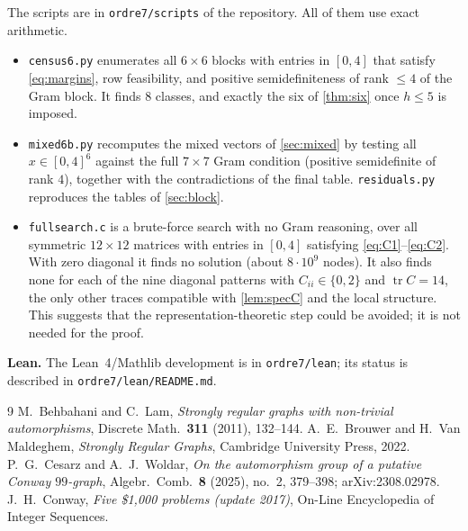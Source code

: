 \documentclass[11pt,a4paper]{amsart}
\theoremstyle{definition}
\theoremstyle{remark}
\newcommand{\tr}{\operatorname{tr}}
\begin{document}
The scripts are in \texttt{ordre7/scripts} of the repository. All of them use exact arithmetic.
\begin{itemize}[leftmargin=2em]
\item \texttt{census6.py} enumerates all $6\times6$ blocks with entries in $[0,4]$ that satisfy
\eqref{eq:margins}, row feasibility, and positive semidefiniteness of rank $\le4$ of the Gram block. It
finds $8$ classes, and exactly the six of \cref{thm:six} once $h\le5$ is imposed.
\item \texttt{mixed6b.py} recomputes the mixed vectors of \cref{sec:mixed} by testing all
$x\in[0,4]^6$ against the full $7\times7$ Gram condition (positive semidefinite of rank $4$), together
with the contradictions of the final table. \texttt{residuals.py} reproduces the tables of
\cref{sec:block}.
\item \texttt{fullsearch.c} is a brute-force search with no Gram reasoning, over all symmetric
$12\times12$ matrices with entries in $[0,4]$ satisfying \eqref{eq:C1}--\eqref{eq:C2}. With zero diagonal
it finds no solution (about $8\cdot10^9$ nodes). It also finds none for each of the nine diagonal patterns
with $C_{ii}\in\{0,2\}$ and $\tr C=14$, the only other traces compatible with \cref{lem:specC} and the local
structure. This suggests that the representation-theoretic step could be avoided; it is not needed for the
proof.
\end{itemize}

\noindent\textbf{Lean.} The Lean~4/Mathlib development is in \texttt{ordre7/lean}; its status is described
in \texttt{ordre7/lean/README.md}.

\begin{thebibliography}{9}
 M.~Behbahani and C.~Lam, \emph{Strongly regular graphs with non-trivial automorphisms},
Discrete Math.\ \textbf{311} (2011), 132--144.
 A.~E.~Brouwer and H.~Van Maldeghem, \emph{Strongly Regular Graphs}, Cambridge University
Press, 2022.
 P.~G.~Cesarz and A.~J.~Woldar, \emph{On the automorphism group of a putative Conway
$99$-graph}, Algebr.\ Comb.\ \textbf{8} (2025), no.~2, 379--398; arXiv:2308.02978.
 J.~H.~Conway, \emph{Five \$1{,}000 problems (update 2017)}, On-Line Encyclopedia of
Integer Sequences.
\end{thebibliography}
\end{document}
